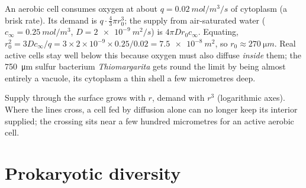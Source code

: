\begin{example}\label{ex:b2:unicellular-diversity:howbig}
An aerobic cell consumes oxygen at about $q = \qty{0.02}{mol/m^3/s}$
of cytoplasm (a brisk rate). Its demand is $q \cdot \tfrac{4}{3}\pi
r_0^3$; the supply from air-saturated water ($c_\infty =
\qty{0.25}{mol/m^3}$, $D = \qty{2e-9}{m^2/s}$) is $4\pi D r_0
c_\infty$. Equating, $r_0^2 = 3Dc_\infty/q = 3\times 2\times 10^{-9}
\times 0.25/0.02 = \qty{7.5e-8}{m^2}$, so $r_0 \approx
\qty{270}{\micro m}$. Real active cells stay well below this because
oxygen must also diffuse \emph{inside} them; the \qty{750}{\micro m}
sulfur bacterium \emph{Thiomargarita} gets round the limit by being
almost entirely a vacuole, its cytoplasm a thin shell a few
micrometres deep.
\end{example}

\begin{omfigure}

{\small Supply through the surface grows with $r$, demand with
$r^3$ (logarithmic axes). Where the lines cross, a cell fed by
diffusion alone can no longer keep its interior supplied; the
crossing sits near a few hundred micrometres for an active aerobic
cell.}
\end{omfigure}

\section{Prokaryotic diversity}

